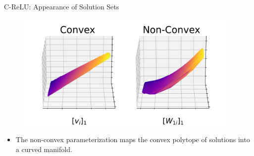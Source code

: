 \documentclass[usenames,dvipsnames,mathserif,notheorems]{beamer}
\newcommand{\bad}[1]{\textcolor{bad}{#1}}
\newcommand{\good}[1]{\textcolor{good}{#1}}
\begin{document}
\begin{frame}{C-ReLU: Appearance of Solution Sets}
	\begin{figure}[]
		\centering
		\includegraphics[width=0.96\textwidth]{assets/solution_sets_vis_270.png}
	\end{figure}

	\begin{itemize}
		\item The non-convex parameterization maps the \good{convex polytope} of
		      solutions into a \bad{curved manifold}.
	\end{itemize}


\end{frame}
\end{document}
